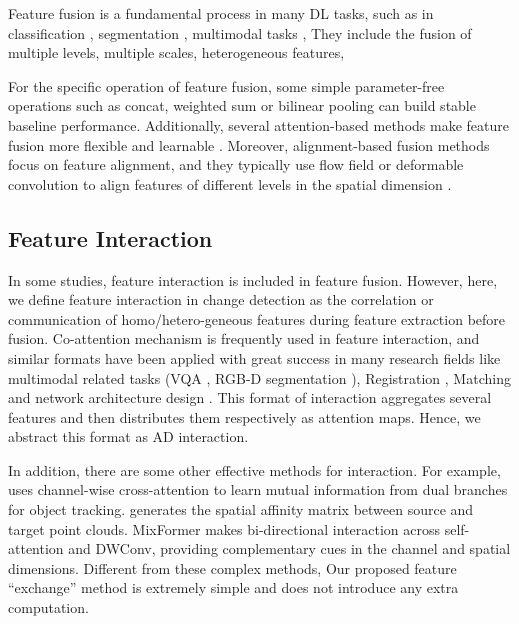 \documentclass[10pt,twocolumn,letterpaper]{article}
\begin{document}
Feature fusion is a fundamental process in many DL tasks, such as in classification \cite{sun2019deep, yu2021lite}, segmentation \cite{kirillov2019panoptic, ronneberger2015u}, multimodal tasks \cite{wang2016modality}, \etc They include the fusion of multiple levels, multiple scales, heterogeneous features, \etc

For the specific operation of feature fusion, some simple parameter-free operations such as concat, weighted sum or bilinear pooling \cite{lin2015bilinear} can build stable baseline performance. Additionally, several attention-based methods make feature fusion more flexible and learnable \cite{li2020gated, dai2021attentional, feng2021encoder, bandara2022hypertransformer, zhou2022canet}. Moreover, alignment-based fusion methods focus on feature alignment, and they typically use flow field or deformable convolution \cite{dai2017deformable, zhu2019deformable} to align features of different levels in the spatial dimension \cite{li2020semantic, huang2021alignseg, huang2021fapn, wang2019edvr, tian2020tdan}.


\subsection{Feature Interaction}
In some studies, feature interaction is included in feature fusion. However, here, we define feature interaction in change detection as the correlation or communication of homo/hetero-geneous features during feature extraction before fusion. Co-attention mechanism \cite{lu2016hierarchical} is frequently used in feature interaction, and similar formats have been applied with great success in many research fields like multimodal related tasks (\eg VQA \cite{nguyen2018improved}, RGB-D segmentation \cite{chen2020bi}), Registration \cite{wu2021feature}, Matching \cite{wei2020multi} and network architecture design \cite{li2019selective}. This format of interaction aggregates several features and then distributes them respectively as attention maps. Hence, we abstract this format as AD interaction.

In addition, there are some other effective methods for interaction. For example, \cite{yu2020deformable} uses channel-wise cross-attention to learn mutual information from dual branches for object tracking. \cite{wu2021feature} generates the spatial affinity matrix between source and target point clouds. MixFormer \cite{chen2022mixformer} makes bi-directional interaction across self-attention and DWConv, providing complementary cues in the channel and spatial dimensions. Different from these complex methods, Our proposed feature ``exchange'' method is extremely simple and does not introduce any extra computation.
\end{document}
